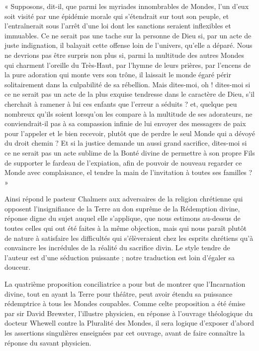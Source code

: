 \documentclass[a4paper, 11pt, oneside]{article}
\begin{document}
« Supposons, dit-il, que parmi les myriades innombrables de Mondes, l'un d'eux soit visité par une épidémie morale qui s'étendrait sur tout son peuple, et l'entraînerait sous l'arrêt d'une loi dont les sanctions seraient inflexibles et immuables. Ce ne serait pas une tache sur la personne de Dieu si, par un acte de juste indignation, il balayait cette offense loin de l'univers, qu'elle a déparé. Nous ne devrions pas être surpris non plus si, parmi la multitude des autres Mondes qui charment l'oreille du Très-Haut, par l'hymne de leurs prières, par l'encens de la pure adoration qui monte vers son trône, il laissait le monde égaré périr solitairement dans la culpabilité de sa rébellion. Mais dites-moi, oh ! dites-moi si ce ne serait pas un acte de la plus exquise tendresse dans le caractère de Dieu, s'il cherchait à ramener à lui ces enfants que l'erreur a séduits ? et, quelque peu nombreux qu'ils soient lorsqu'on les compare à la multitude de ses adorateurs, ne conviendrait-il pas à sa compassion infinie de lui envoyer des messagers de paix pour l'appeler et le bien recevoir, plutôt que de perdre le seul Monde qui a dévoyé du droit chemin ? Et si la justice demande un aussi grand sacrifice, dites-moi si ce ne serait pas un acte sublime de la Bonté divine de permettre à son propre Fils de supporter le fardeau de l'expiation, afin de pouvoir de nouveau regarder ce Monde avec complaisance, el tendre la main de l'invitation à toutes ses familles ? »

Ainsi répond le pasteur Chalmers aux adversaires de la religion chrétienne qui opposent l'insignifiance de la Terre au don suprême de la Rédemption divine, réponse digne du sujet auquel elle s'applique, que nous estimons au-dessus de toutes celles qui out été faites à la même objection, mais qui nous paraît plutôt de nature à satisfaire les difficultés qui s'élèveraient chez les esprits chrétiens qu'à convaincre les incrédules de la réalité du sacrifice divin. Le style tendre de l'auteur est d'une séduction puissante ; notre traduction est loin d'égaler sa douceur.

La quatrième proposition conciliatrice a pour but de montrer que l'Incarnation divine, tout en ayant la Terre pour théâtre, peut avoir étendu sa puissance rédemptrice à tous les Mondes coupables. Comme celte proposition a été émise par sir David Brewster, l'illustre physicien, en réponse à l'ouvrage théologique du docteur Whewell contre la Pluralité des Mondes, il sera logique d'exposer d'abord les assertions singulières enseignées par cet ouvrage, avant de faire connaître la réponse du savant physicien.
\end{document}
